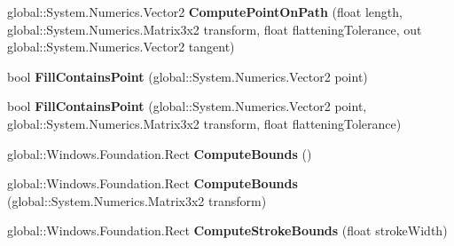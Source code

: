 \begin{DoxyCompactItemize}
\item 
\mbox{\label{interface_microsoft_1_1_graphics_1_1_canvas_1_1_geometry_1_1_i_canvas_geometry_ad81c3e0d8ae57428fe171ea8ae3cf362}} 
global\+::\+System.\+Numerics.\+Vector2 {\bfseries Compute\+Point\+On\+Path} (float length, global\+::\+System.\+Numerics.\+Matrix3x2 transform, float flattening\+Tolerance, out global\+::\+System.\+Numerics.\+Vector2 tangent)
\item 
\mbox{\label{interface_microsoft_1_1_graphics_1_1_canvas_1_1_geometry_1_1_i_canvas_geometry_ab005a35192b8530d5130afda195edc90}} 
bool {\bfseries Fill\+Contains\+Point} (global\+::\+System.\+Numerics.\+Vector2 point)
\item 
\mbox{\label{interface_microsoft_1_1_graphics_1_1_canvas_1_1_geometry_1_1_i_canvas_geometry_a3f57176b32e683124f11427fcc2c81d7}} 
bool {\bfseries Fill\+Contains\+Point} (global\+::\+System.\+Numerics.\+Vector2 point, global\+::\+System.\+Numerics.\+Matrix3x2 transform, float flattening\+Tolerance)
\item 
\mbox{\label{interface_microsoft_1_1_graphics_1_1_canvas_1_1_geometry_1_1_i_canvas_geometry_a6c649b42af2ad0758018d7c80627f36d}} 
global\+::\+Windows.\+Foundation.\+Rect {\bfseries Compute\+Bounds} ()
\item 
\mbox{\label{interface_microsoft_1_1_graphics_1_1_canvas_1_1_geometry_1_1_i_canvas_geometry_a95cc7e7112718afb642f295a64915386}} 
global\+::\+Windows.\+Foundation.\+Rect {\bfseries Compute\+Bounds} (global\+::\+System.\+Numerics.\+Matrix3x2 transform)
\item 
\mbox{\label{interface_microsoft_1_1_graphics_1_1_canvas_1_1_geometry_1_1_i_canvas_geometry_a85348d384cde919169814908c2636f61}} 
global\+::\+Windows.\+Foundation.\+Rect {\bfseries Compute\+Stroke\+Bounds} (float stroke\+Width)
\item 

\end{DoxyCompactItemize}
